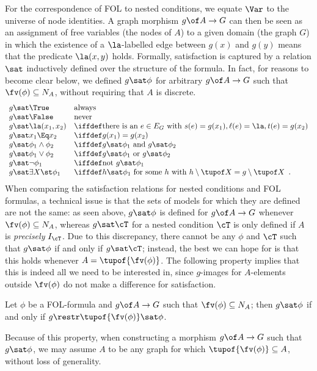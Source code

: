 For the correspondence of FOL to nested conditions, we equate $\Var$ to the universe of node identities. A graph morphism $g\of A\to G$ can then be seen as an assignment of free variables (the nodes of $A$) to a given domain (the graph $G$) in which the existence of a $\la$-labelled edge between $g(x)$ and $g(y)$ means that the predicate $\la(x,y)$ holds. Formally, satisfaction is captured by a relation $\sat$ inductively defined over the structure of the formula. In fact, for reasons to become clear below, we defined $g\sat \phi$ for arbitrary $g\of A\to G$ such that $\fv(\phi)\subseteq N_A$, without requiring that $A$ is discrete.
%
\[\begin{array}{ll}
g\sat \True & \text{always} \\
g\sat \False & \text{never} \\
g\sat \la(x_1,x_2) & \iffdef \text{there is an } e\in E_G \text{ with } s(e)=g(x_1), \ell(e)=\la, t(e)=g(x_2) \\
g\sat x_1\Eq x_2 & \iffdef g(x_1)=g(x_2) \\
g\sat \phi_1\wedge \phi_2 & \iffdef g\sat \phi_1 \text{ and } g\sat \phi_2 \\
g\sat \phi_1\vee \phi_2 & \iffdef g\sat \phi_1 \text{ or } g\sat \phi_2 \\
g\sat \neg\phi_1 & \iffdef \text{not } g\sat \phi_1 \\
g\sat \exists X\st \phi_1  & \iffdef h\sat \phi_1 \text{ for some } h \text{ with } h\setminus \tupof X =g\setminus \tupof X \enspace.
\end{array}\]
%
When comparing the satisfaction relations for nested conditions and FOL formulas, a technical issue is that the sets of models for which they are defined are not the same: as seen above, $g\sat\phi$ is defined for $g\of A\to G$ whenever $\fv(\phi)\subseteq N_A$, whereas $g\sat\cT$ for a nested condition $\cT$ is only defined if $A$ is \emph{precisely} $I_\cT$. Due to this discrepancy, there cannot be any $\phi$ and $\cT$ such that $g\sat \phi$ if and only if $g\sat \cT$; instead, the best we can hope for is that this holds whenever $A=\tupof{\fv(\phi)}$. The following property implies that this is indeed all we need to be interested in, since $g$-images for $A$-elements outside $\fv(\phi)$ do not make a difference for satisfaction.

\begin{proposition}\label{prop:free vars only}
Let $\phi$ be a FOL-formula and $g\of A\to G$ such that $\fv(\phi)\subseteq N_A$; then $g\sat \phi$ if and only if $g\restr \tupof{\fv(\phi)}\sat \phi$.
\end{proposition}
%
Because of this property, when constructing a morphism $g\of A\to G$ such that $g\sat \phi$, we may assume $A$ to be any graph for which $\tupof{\fv(\phi)}\subseteq A$, without loss of generality.

